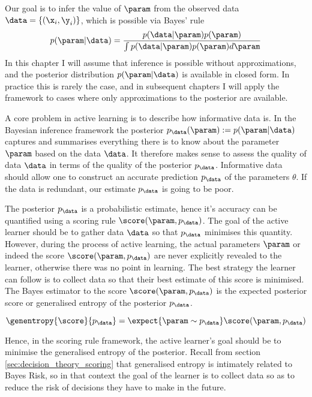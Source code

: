 Our goal is to infer the value of $\param$ from the observed data $\data = \{(\x_i,\y_i)\}$, which is possible via Bayes' rule
\begin{equation}
p(\param\vert\data) = \frac{p(\data\vert\param)p(\param)}{\int p(\data\vert\param)p(\param) d\param}
\end{equation}
In this chapter I will assume that inference is possible without approximations, and the posterior distribution $p(\param\vert\data)$ is available in closed form. In practice this is rarely the case, and in subsequent chapters I will apply the framework to cases where only approximations to the posterior are available.

A core problem in active learning is to describe how informative data is. In the Bayesian inference framework the posterior $p_\data(\param) := p(\param\vert\data)$ captures and summarises everything there is to know about the parameter $\param$ based on the data $\data$. It therefore makes sense to assess the quality of data $\data$ in terms of the quality of the posterior $p_\data$. Informative data should allow one to construct an accurate prediction $p_\data$ of the parameters $\theta$. If the data is redundant, our estimate $p_\data$ is going to be poor.

The posterior $p_\data$ is a probabilistic estimate, hence it's accuracy can be quantified using a scoring rule $\score(\param,p_\data)$. The goal of the active learner should be to gather data $\data$ so that $p_\data$ minimises this quantity. However, during the process of active learning, the actual parameters $\param$ or indeed the score $\score(\param,p_\data)$ are never explicitly revealed to the learner, otherwise there was no point in learning. The best strategy the learner can follow is to collect data so that their best estimate of this score is minimised. The Bayes estimator to the score $\score(\param,p_\data)$ is the expected posterior score or generalised entropy of the posterior $p_\data$.

\begin{equation}
	\genentropy{\score}{p_\data} = \expect{\param\sim p_\data} \score(\param,p_\data)
\end{equation}

Hence, in the scoring rule framework, the active learner's goal should be to minimise the generalised entropy of the posterior. Recall from section \ref{sec:decision_theory_scoring} that generalised entropy is intimately related to Bayes Risk, so in that context the goal of the learner is to collect data so as to reduce the risk of decisions they have to make in the future.


